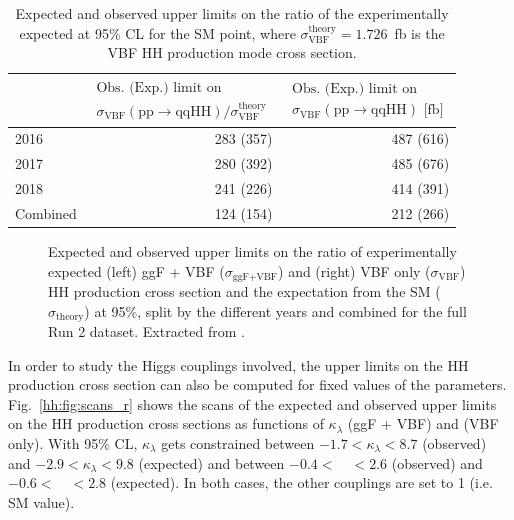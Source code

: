 \documentclass[../main.tex]{subfiles}
\begin{document}
\begin{table}[h!]
\begin{center}
\begin{tabular}{l | r | r}
& 
$
\begin{matrix}
\text{Obs. (Exp.) limit on } \\ \sigma_{\text{VBF}}(\text{pp}\to\text{qqHH})/ \sigma_{\text{VBF}}^{\text{theory}} 
\end{matrix}
$
& 
$
\begin{matrix}
\text{Obs. (Exp.) limit on } \\ \sigma_{\text{VBF}}(\text{pp}\to\text{qqHH}) \text{~[fb]}
\end{matrix}
$ \\ \hline
2016 &     283 (357) & 487 (616) \\
2017 &     280 (392) & 485 (676) \\
2018 &     241 (226) & 414 (391) \\
Combined & 124 (154) & 212 (266)
\end{tabular}
\end{center}
\caption[Upper limits on the HH VBF-only production cross section]{Expected and observed upper limits on the ratio of the experimentally expected  at 95\% CL for the SM point, where $\sigma_{\text{VBF}}^{\text{theory}}=1.726$~fb is the VBF HH production mode cross section.}
\label{hh:tab:limit_rvbf}
\end{table}


\begin{figure}[h!]
\begin{center}
\end{center}
\caption[Upper limits on the inclusive and VBF-only production cross sections]{Expected and observed upper limits on the ratio of experimentally expected (left) ggF + VBF ($\sigma_{\text{ggF+VBF}}$) and (right) VBF only ($\sigma_{\text{VBF}}$) HH production cross section and the expectation from the SM ($\sigma_\text{theory}$) at 95\%, split by the different years and combined for the full Run 2 dataset. Extracted from \cite{hh:analysis:run2}.}
\label{hh:fig:limits_r}
\end{figure}

In order to study the Higgs couplings involved, the upper limits on the HH production cross section can also be computed for fixed values of the parameters. Fig.~\ref{hh:fig:scans_r} shows the scans of the expected and observed upper limits on the HH production cross sections as functions of $\kappa_\lambda$ (ggF + VBF) and \kvv{} (VBF only). With 95\% CL, $\kappa_\lambda$ gets constrained between $ -1.7 <\kappa_\lambda < 8.7$ (observed) and $-2.9 < \kappa_\lambda < 9.8$ (expected) and \kvv{} between $-0.4 <$~\kvv{}~$< 2.6$ (observed) and $-0.6<$~\kvv{}~$<  2.8$ (expected). In both cases, the other couplings are set to 1 (i.e. SM value).
\end{document}
